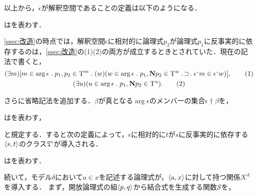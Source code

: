 以上から，$\epsilon$が解釈空間であることの定義は以下のようになる．
\begin{df}
\label{df:解釈空間}
はを表わす．
\end{df}

\ref{ssec:改造}の時点では，解釈空間$\epsilon$に相対的に論理式$p_2$が論理式$p_1$に反事実的に依存するのは，\ref{ssec:改造}の(1)(2)の両方が成立するときとされていた．現在の記法で書くと，
\begin{gather}
    (\exists m)[
        m\in\arg\epsilon\con{1}p_1,p_2\in \mathrm{T}^m\con{1}
        (w)(w\in\arg \epsilon\con{1}p_1,\mathbf{N}p_2\in \mathrm{T}^w\case{1}{1}{1}\epsilon\fap m\in\epsilon\fap w)
    ],\tag{1}\\
    (\exists u)(u\in\arg\epsilon\con{1}p_1,\mathbf{N}p_2\in \mathrm{T}^u).\tag{2}
\end{gather}

\noindent さらに省略記法を追加する．$\beta$が真となる$\arg\epsilon$のメンバーの集合$ \epsilon\dagger\beta $を，
\begin{df}
\label{df:真理化する到達可能モデルの集合}
\kagi{$
    \epsilon\dagger\beta
$}はを表わす，
\end{df}
\noindent と規定する．すると次の定義によって，$\epsilon$に相対的に$t$が$s$に反事実的に依存する$\langle s,t \rangle$のクラス$\mathfrak{T}^\epsilon$が導入される．

\begin{df}
\label{df:反事実的依存関係}
はを表わす．
\end{df}

続いて，モデル$\delta$において$ a\in x $を記述する論理式が，$ \langle a,x \rangle $に対して持つ関係$ \mathcal{K}^\delta $を導入する．
まず，開放論理式の組$ \langle p,q \rangle $から結合式を生成する関数$ \mathcal{S} $を，


